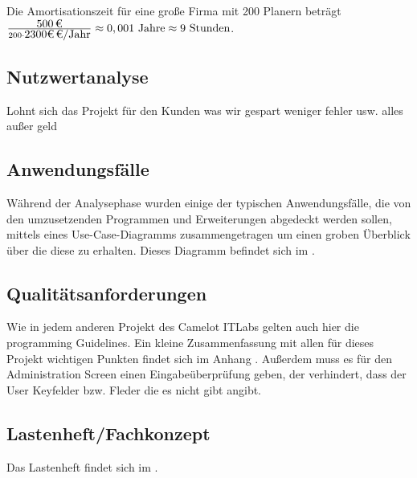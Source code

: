 Die Amortisationszeit für eine große Firma mit 200 Planern beträgt
$\frac{\eur{500}}{200 \cdot \eur{2300€} \mbox{/Jahr} } \approx 0,001 \mbox{ Jahre} \approx 9 \mbox{ Stunden}$.

\subsection{Nutzwertanalyse}
\label{sec:Nutzwertanalyse}
Lohnt sich das Projekt für den Kunden was wir gespart weniger fehler usw. alles außer geld


\subsection{Anwendungsfälle}
\label{sec:Anwendungsfaelle}
Während der Analysephase wurden einige der typischen Anwendungsfälle, die von den umzusetzenden Programmen und Erweiterungen abgedeckt werden sollen, mittels eines Use-Case-Diagramms zusammengetragen um einen groben Überblick über die diese zu erhalten. Dieses Diagramm befindet sich im .

\subsection{Qualitätsanforderungen}
\label{sec:Qualitaetsanforderungen}
Wie in jedem anderen Projekt des Camelot ITLabs gelten auch hier die programming Guidelines. Ein kleine Zusammenfassung mit allen für dieses Projekt wichtigen Punkten findet sich im Anhang . Außerdem muss es für den Administration Screen einen Eingabeüberprüfung geben, der verhindert, dass der User Keyfelder bzw. Fleder die es nicht gibt angibt.

\subsection{Lastenheft/Fachkonzept}
\label{sec:Lastenheft}
Das Lastenheft findet sich im . 

